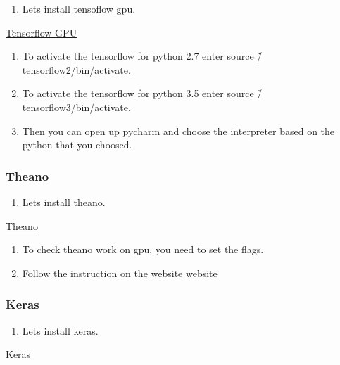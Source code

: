 \documentclass[12pt]{article}
\begin{document}
\begin{enumerate}[resume]
  \item Lets install tensoflow gpu.
\end{enumerate}

\begin{center}
\href{run:./Text_Files_14/tensorflow.txt}{\Large Tensorflow GPU}
\end{center}

\begin{enumerate}[resume]
  \item To activate the tensorflow for python 2.7 enter source \~/tensorflow2/bin/activate.
  \item To activate the tensorflow for python 3.5 enter source \~/tensorflow3/bin/activate.
  \item Then you can open up pycharm and choose the interpreter based on the python that you choosed.
\end{enumerate}

\subsubsection{Theano}

\begin{enumerate}[resume]
  \item Lets install theano.
\end{enumerate}

\begin{center}
\href{run:./Text_Files_14/Theano.txt}{\Large Theano}
\end{center}

\begin{enumerate}[resume]
  \item To check theano work on gpu, you need to set the flags.
  \item Follow the instruction on the website \href{http://theano.readthedocs.io/en/0.8.x/tutorial/using_gpu.html}{website}
\end{enumerate}

\subsubsection{Keras}

\begin{enumerate}[resume]
  \item Lets install keras.
\end{enumerate}

\begin{center}
\href{run:./Text_Files_14/Keras.txt}{\Large Keras}
\end{center}
\end{document}
